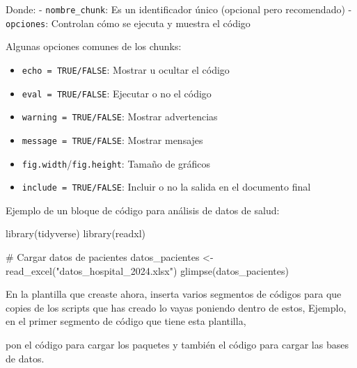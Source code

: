 \documentclass[
  letterpaper,
  DIV=11,
  numbers=noendperiod]{scrreprt}
\newenvironment{Shaded}{\begin{snugshade}}{\end{snugshade}}
\newcommand{\AttributeTok}[1]{\textcolor[rgb]{0.40,0.45,0.13}{#1}}
\newcommand{\CommentTok}[1]{\textcolor[rgb]{0.37,0.37,0.37}{#1}}
\newcommand{\ConstantTok}[1]{\textcolor[rgb]{0.56,0.35,0.01}{#1}}
\newcommand{\FunctionTok}[1]{\textcolor[rgb]{0.28,0.35,0.67}{#1}}
\newcommand{\NormalTok}[1]{\textcolor[rgb]{0.00,0.23,0.31}{#1}}
\newcommand{\OtherTok}[1]{\textcolor[rgb]{0.00,0.23,0.31}{#1}}
\newcommand{\SpecialCharTok}[1]{\textcolor[rgb]{0.37,0.37,0.37}{#1}}
\newcommand{\StringTok}[1]{\textcolor[rgb]{0.13,0.47,0.30}{#1}}
\providecommand{\tightlist}{%
  \setlength{\itemsep}{0pt}\setlength{\parskip}{0pt}}\usepackage{longtable,booktabs,array}
\begin{document}
Donde: - \texttt{nombre\_chunk}: Es un identificador único (opcional
pero recomendado) - \texttt{opciones}: Controlan cómo se ejecuta y
muestra el código

Algunas opciones comunes de los chunks:

\begin{itemize}
\tightlist
\item
  \texttt{echo\ =\ TRUE/FALSE}: Mostrar u ocultar el código
\item
  \texttt{eval\ =\ TRUE/FALSE}: Ejecutar o no el código
\item
  \texttt{warning\ =\ TRUE/FALSE}: Mostrar advertencias
\item
  \texttt{message\ =\ TRUE/FALSE}: Mostrar mensajes
\item
  \texttt{fig.width}/\texttt{fig.height}: Tamaño de gráficos
\item
  \texttt{include\ =\ TRUE/FALSE}: Incluir o no la salida en el
  documento final
\end{itemize}

Ejemplo de un bloque de código para análisis de datos de salud:

\begin{Shaded}
\begin{Highlighting}[]
\FunctionTok{library}\NormalTok{(tidyverse)}
\FunctionTok{library}\NormalTok{(readxl)}

\CommentTok{\# Cargar datos de pacientes}
\NormalTok{datos\_pacientes }\OtherTok{\textless{}{-}} \FunctionTok{read\_excel}\NormalTok{(}\StringTok{"datos\_hospital\_2024.xlsx"}\NormalTok{)}
\FunctionTok{glimpse}\NormalTok{(datos\_pacientes)}
\end{Highlighting}
\end{Shaded}

En la plantilla que creaste ahora, inserta varios segmentos de códigos
para que copies de los scripts que has creado lo vayas poniendo dentro
de estos, Ejemplo, en el primer segmento de código que tiene esta
plantilla,

\begin{Shaded}
\end{Shaded}

pon el código para cargar los paquetes y también el código para cargar
las bases de datos.
\end{document}
